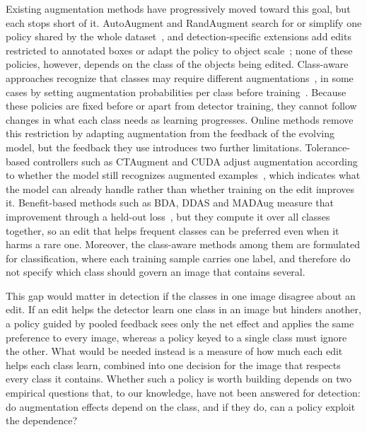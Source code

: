 \documentclass[conference]{IEEEtran}
\begin{document}
Existing augmentation methods have progressively moved toward this goal, but each stops short of it. AutoAugment and RandAugment search for or simplify one policy shared by the whole dataset~\cite{cubuk2019auto,cubuk2020rand}, and detection-specific extensions add edits restricted to annotated boxes or adapt the policy to object scale~\cite{zoph2020det,chen2021scale}; none of these policies, however, depends on the class of the objects being edited. Class-aware approaches recognize that classes may require different augmentations~\cite{tsuchiya2019,yoo2023,cheung2022adaaug}, in some cases by setting augmentation probabilities per class before training~\cite{rdd_detectron2}. Because these policies are fixed before or apart from detector training, they cannot follow changes in what each class needs as learning progresses. Online methods remove this restriction by adapting augmentation from the feedback of the evolving model, but the feedback they use introduces two further limitations. Tolerance-based controllers such as CTAugment and CUDA adjust augmentation according to whether the model still recognizes augmented examples~\cite{berthelot2020,ahn2023cuda}, which indicates what the model can already handle rather than whether training on the edit improves it. Benefit-based methods such as BDA, DDAS and MADAug measure that improvement through a held-out loss~\cite{lu2023bda,liu2021ddas,hou2023madaug}, but they compute it over all classes together, so an edit that helps frequent classes can be preferred even when it harms a rare one. Moreover, the class-aware methods among them are formulated for classification, where each training sample carries one label, and therefore do not specify which class should govern an image that contains several.

This gap would matter in detection if the classes in one image disagree about an edit. If an edit helps the detector learn one class in an image but hinders another, a policy guided by pooled feedback sees only the net effect and applies the same preference to every image, whereas a policy keyed to a single class must ignore the other. What would be needed instead is a measure of how much each edit helps each class learn, combined into one decision for the image that respects every class it contains. Whether such a policy is worth building depends on two empirical questions that, to our knowledge, have not been answered for detection: do augmentation effects depend on the class, and if they do, can a policy exploit the dependence?
\end{document}
